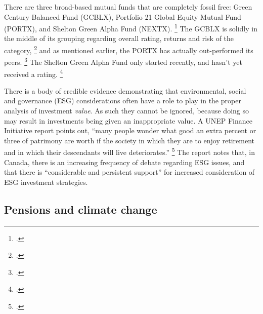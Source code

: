 There are three broad-based mutual funds that are completely fossil free: Green Century Balanced Fund (GCBLX), Portfolio 21 Global Equity Mutual Fund (PORTX), and Shelton Green Alpha Fund (NEXTX). \footcite{GFFMyMoney}
The GCBLX is solidly in the middle of its grouping regarding overall rating, returns and risk of the category, \footcite{GCBLX} and as mentioned earlier, the PORTX has actually out-performed its peers. \footcite{PORTX}
The Shelton Green Alpha Fund only started recently, and hasn't yet received a rating. \footcite{NEXTX}



There is a body of credible evidence demonstrating that environmental, social and governance (ESG) considerations often have a role to play in the proper analysis of investment \emph{value}. 
As such they cannot be ignored, because doing so may result in investments being given an inappropriate value.
A UNEP Finance Initiative report points out, ``many people wonder what good an extra percent or three of patrimony are worth if the society in which they are to enjoy retirement and in which their descendants will live deteriorates.'' \footcite{UNEPFinanceInit}
The report notes that, in Canada, there is an increasing frequency of debate regarding ESG issues, and that there is ``considerable and persistent support'' for increased consideration of ESG investment strategies.



\subsection {Pensions and climate change}



